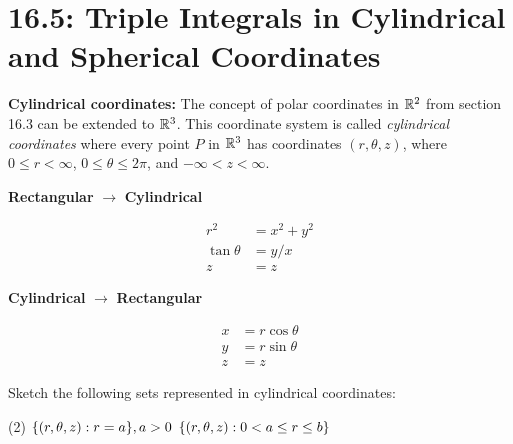 \documentclass[../mathNotesPreamble]{subfiles}
\begin{document}
\section{16.5: Triple Integrals in Cylindrical and Spherical Coordinates}

  \textbf{Cylindrical coordinates:}\newline
  The concept of polar coordinates in $\mathbb{R}^2$ from section 16.3 can be extended to $\mathbb{R}^3$. This coordinate system is called \textit{cylindrical coordinates} where every point $P$ in $\mathbb{R}^3$ has coordinates $(r,\theta, z)$, where $0\leq r<\infty$, $0\leq\theta\leq 2\pi$, and $-\infty<z<\infty$.

  \begin{thmBox*}
    \vspace*{0.5\baselineskip}
    \begin{minipage}{0.5\linewidth}
      \begin{center}
        \textbf{Rectangular} $\rightarrow$ \textbf{Cylindrical}
      \end{center}
      \begin{align*}
        r^2&=x^2+y^2\\
        \tan\theta&=y/x\\
        z&=z
      \end{align*}
    \end{minipage}%
    \begin{minipage}{0.5\linewidth}
      \begin{center}
        \textbf{Cylindrical} $\rightarrow$ \textbf{Rectangular}
      \end{center}
      \begin{align*}
        x&=r\cos\theta\\
        y&=r\sin\theta\\
        z&=z
      \end{align*}
    \end{minipage}%
  \end{thmBox*}

  \begin{ex*}
    Sketch the following sets represented in cylindrical coordinates:
  \end{ex*}
  \begin{tasks}[after-item-skip=\stretch{1}, label=](2)
    \task ${\left\{(r,\theta,z): r=a\right\}}, a>0$
    \task ${\left\{(r,\theta,z): 0<a\leq r\leq b\right\}}$
  \end{tasks}
  \pagebreak
  
\end{document}
